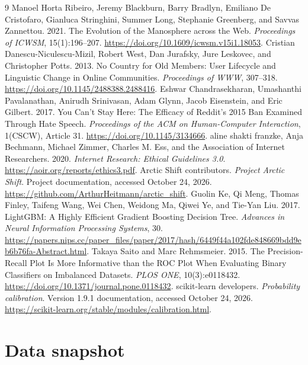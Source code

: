 \documentclass[10pt,twocolumn]{article}
\begin{document}
\begin{thebibliography}{9}
 Manoel Horta Ribeiro, Jeremy Blackburn, Barry Bradlyn, Emiliano De Cristofaro, Gianluca Stringhini, Summer Long, Stephanie Greenberg, and Savvas Zannettou. 2021. The Evolution of the Manosphere across the Web. \emph{Proceedings of ICWSM}, 15(1):196--207. \url{https://doi.org/10.1609/icwsm.v15i1.18053}.
 Cristian Danescu-Niculescu-Mizil, Robert West, Dan Jurafsky, Jure Leskovec, and Christopher Potts. 2013. No Country for Old Members: User Lifecycle and Linguistic Change in Online Communities. \emph{Proceedings of WWW}, 307--318. \url{https://doi.org/10.1145/2488388.2488416}.
 Eshwar Chandrasekharan, Umashanthi Pavalanathan, Anirudh Srinivasan, Adam Glynn, Jacob Eisenstein, and Eric Gilbert. 2017. You Can't Stay Here: The Efficacy of Reddit's 2015 Ban Examined Through Hate Speech. \emph{Proceedings of the ACM on Human-Computer Interaction}, 1(CSCW), Article 31. \url{https://doi.org/10.1145/3134666}.
 aline shakti franzke, Anja Bechmann, Michael Zimmer, Charles M. Ess, and the Association of Internet Researchers. 2020. \emph{Internet Research: Ethical Guidelines 3.0}. \url{https://aoir.org/reports/ethics3.pdf}.
 Arctic Shift contributors. \emph{Project Arctic Shift}. Project documentation, accessed October 24, 2026. \url{https://github.com/ArthurHeitmann/arctic_shift}.
 Guolin Ke, Qi Meng, Thomas Finley, Taifeng Wang, Wei Chen, Weidong Ma, Qiwei Ye, and Tie-Yan Liu. 2017. LightGBM: A Highly Efficient Gradient Boosting Decision Tree. \emph{Advances in Neural Information Processing Systems}, 30. \url{https://papers.nips.cc/paper_files/paper/2017/hash/6449f44a102fde848669bdd9eb6b76fa-Abstract.html}.
 Takaya Saito and Marc Rehmsmeier. 2015. The Precision-Recall Plot Is More Informative than the ROC Plot When Evaluating Binary Classifiers on Imbalanced Datasets. \emph{PLOS ONE}, 10(3):e0118432. \url{https://doi.org/10.1371/journal.pone.0118432}.
 scikit-learn developers. \emph{Probability calibration}. Version 1.9.1 documentation, accessed October 24, 2026. \url{https://scikit-learn.org/stable/modules/calibration.html}.
\end{thebibliography}

\appendix
\section{Data snapshot}
\begin{table}[t]\centering\small

\caption{Local acquisition snapshot. Completion describes retrieval status, not verified completeness of Reddit history.}\label{tab:streams}
\end{table}
\end{document}
